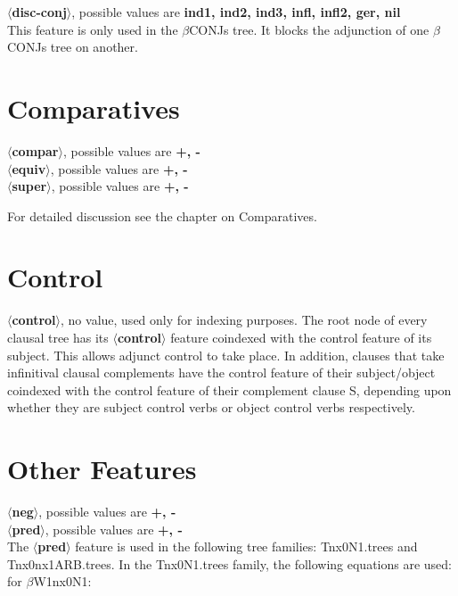 {\bf $\langle$disc-conj$\rangle$}, possible values are {\bf ind1, ind2, ind3, infl, infl2, ger, nil}\\
This feature is only used in the $\beta$CONJs tree.
It blocks the adjunction of one $\beta$CONJs tree on another.

\section{Comparatives}
{\bf $\langle$compar$\rangle$}, possible values are {\bf +, -}\\
{\bf $\langle$equiv$\rangle$}, possible values are {\bf +, -}\\
{\bf $\langle$super$\rangle$}, possible values are {\bf +, -}

For detailed discussion see the chapter on Comparatives.

\section{Control}
{\bf $\langle$control$\rangle$}, no value, used only for indexing purposes.
The root node of every clausal tree has its {\bf $\langle$control$\rangle$}
feature coindexed with the control feature of its subject. 
This allows adjunct control to take place. In addition, clauses
that take infinitival clausal complements have the control
feature of their subject/object coindexed with the control feature
of their complement clause S, depending upon whether they are
subject control verbs or object control verbs respectively.


\section{Other Features}
{\bf $\langle$neg$\rangle$}, possible values are {\bf +, -}\\

{\bf $\langle$pred$\rangle$}, possible values are {\bf +, -}\\
The {\bf $\langle$pred$\rangle$} feature is used in the following tree
families: Tnx0N1.trees and Tnx0nx1ARB.trees.
In the Tnx0N1.trees family, the following equations are used:\\
for $\beta$W1nx0N1:


